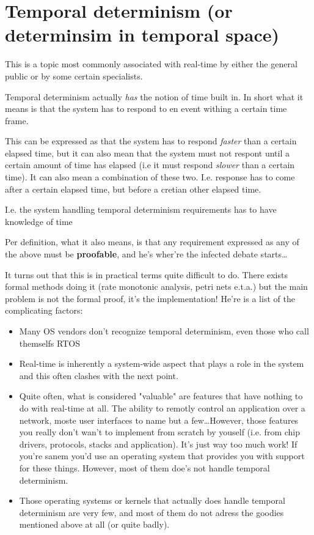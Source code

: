 \chapter{Temporal determinism (or determinsim in temporal space)}
This is a topic most commonly associated with real-time by either the general public or by some certain specialists.

Temporal determinism actually \textit{has} the notion of time built in. In short what it means is that the system has to respond to en event withing a certain time frame. 

This can be expressed as that the system has to respond \textit{faster} than a certain elapsed time, but it can also mean that the system must not respont until a certain amount of time has elapsed (i.e it must respond \textit{slower} than a certain time). It can also mean a combination of these two. I.e. response has to come after a certain elapsed time, but before a cretian other elapsed time.

I.e. the system handling temporal determinism requirements has to have knowledge of time 

Per definition, what it also means, is that any requirement expressed as any of the above must be \textbf{\textit{}proofable}, and he's wher're the infected debate starts\ldots

It turns out that this is in practical terms quite difficult to do. There exists formal methods doing it (rate monotonic analysis, petri nets e.t.a.) but the main problem is not the formal proof, it's the implementation! He're is a list of the complicating factors:

\begin{itemize}
\item Many OS vendors don't recognize temporal determinism, even those who call themselfs RTOS 
\item Real-time is inherently a system-wide aspect that plays a role in the system and this often clashes with the next point.
\item Quite often, what is considered "valuable" are features that have nothing to do with real-time at all. The ability to remotly control an application over a network, moste user interfaces to name but a few\ldots However, those features you really don't wan't to implement from scratch by youself (i.e. from chip drivers, protocols, stacks and application). It's just way too much work! If you're sanem you'd use an operating system that provides you with support for these things. However, most of them doe's not handle temporal determinism.
\item Those operating systems or kernels that actually does handle temporal determinism are very few, and most of them do not adress the goodies mentioned above at all (or quite badly).
\end{itemize}

